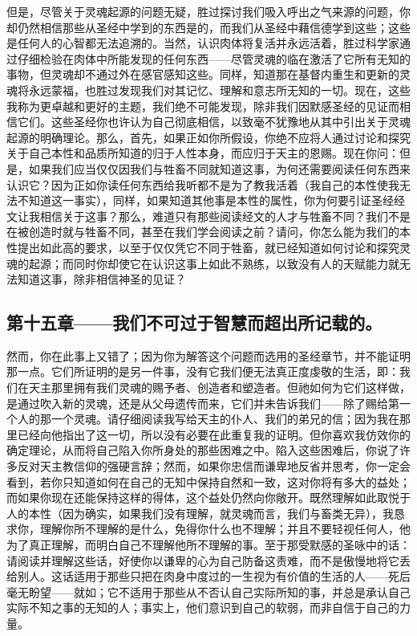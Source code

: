 但是，尽管关于灵魂起源的问题无疑，胜过探讨我们吸入呼出之气来源的问题，你却仍然相信那些从圣经中学到的东西是的，而我们从圣经中藉信德学到这些；这些是任何人的心智都无法追溯的。当然，认识肉体将复活并永远活着，胜过科学家通过仔细检验在肉体中所能发现的任何东西——尽管灵魂的临在激活了它所有无知的事物，但灵魂却不通过外在感官感知这些。同样，知道那在基督内重生和更新的灵魂将永远蒙福，也胜过发现我们对其记忆、理解和意志所无知的一切。现在，这些我称为更卓越和更好的主题，我们绝不可能发现，除非我们因默感圣经的见证而相信它们。这些圣经你也许认为自己彻底相信，以致毫不犹豫地从其中引出关于灵魂起源的明确理论。那么，首先，如果正如你所假设，你绝不应将人通过讨论和探究关于自己本性和品质所知道的归于人性本身，而应归于天主的恩赐。现在你问：但是，如果我们应当仅仅因我们与牲畜不同就知道这事，为何还需要阅读任何东西来认识它？因为正如你读任何东西给我听都不是为了教我活着（我自己的本性使我无法不知道这一事实），同样，如果知道其他事是本性的属性，你为何要引证圣经经文让我相信关于这事？那么，难道只有那些阅读经文的人才与牲畜不同？我们不是在被创造时就与牲畜不同，甚至在我们学会阅读之前？请问，你怎么能为我们的本性提出如此高的要求，以至于仅仅凭它不同于牲畜，就已经知道如何讨论和探究灵魂的起源；而同时你却使它在认识这事上如此不熟练，以致没有人的天赋能力就无法知道这事，除非相信神圣的见证？\par


\subsection{第十五章——我们不可过于智慧而超出所记载的。}

然而，你在此事上又错了；因为你为解答这个问题而选用的圣经章节，并不能证明那一点。它们所证明的是另一件事，没有它我们便无法真正度虔敬的生活，即：我们在天主那里拥有我们灵魂的赐予者、创造者和塑造者。但祂如何为它们这样做，是通过吹入新的灵魂，还是从父母遗传而来，它们并未告诉我们——除了赐给第一个人的那一个灵魂。请仔细阅读我写给天主的仆人、我们的弟兄的信；因为我在那里已经向他指出了这一切，所以没有必要在此重复我的证明。但你喜欢我仿效你的确定理论，从而将自己陷入你所身处的那些困难之中。陷入这些困难后，你说了许多反对天主教信仰的强硬言辞；然而，如果你忠信而谦卑地反省并思考，你一定会看到，若你只知道如何在自己的无知中保持自然和一致，这对你将有多大的益处；而如果你现在还能保持这样的得体，这个益处仍然向你敞开。既然理解如此取悦于人的本性（因为确实，如果我们没有理解，就灵魂而言，我们与畜类无异），我恳求你，理解你所不理解的是什么，免得你什么也不理解；并且不要轻视任何人，他为了真正理解，而明白自己不理解他所不理解的事。至于那受默感的圣咏中的话：请阅读并理解这些话，好使你以谦卑的心为自己防备这责难，而不是傲慢地将它丢给别人。这话适用于那些只把在肉身中度过的一生视为有价值的生活的人——死后毫无盼望——就如；它不适用于那些从不否认自己实际所知的事，并总是承认自己实际不知之事的无知的人；事实上，他们意识到自己的软弱，而非自信于自己的力量。\par

